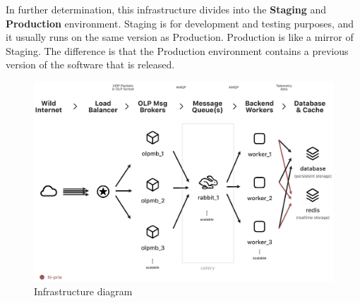In further determination, this infrastructure divides into the \textbf{Staging} and \textbf{Production} environment.
Staging is for development and testing purposes, and it usually runs on the same version as Production.
Production is like a mirror of Staging.
The difference is that the Production environment contains a previous version of the software that is released.









\begin{figure}
    \centering
    \includegraphics[scale=0.3, angle=90]{assets/infrastructure-diagram.png}
    \caption{Infrastructure diagram\cite{dataInfrastructure}}
    \label{fig:infrastracture-diagram}
\end{figure}

